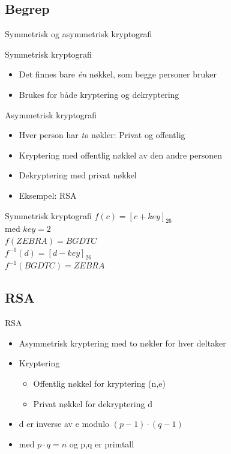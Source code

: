 \subsection*{Begrep}
\begin{frame}{Symmetrisk og asymmetrisk kryptografi}
\begin{block}{Symmetrisk kryptografi}
\begin{itemize}
\item Det finnes bare \textit{én} nøkkel, som begge personer bruker
\item Brukes for både kryptering og dekryptering
\end{itemize}
\end{block}
\pause
\begin{block}{Asymmetrisk kryptografi}
\begin{itemize}
\item Hver person har \textit{to} nøkler: Privat og offentlig
\item Kryptering med offentlig nøkkel av den andre personen
\item Dekryptering med privat nøkkel
\item Eksempel: RSA
\end{itemize}
\end{block}
\end{frame}

\begin{frame}{Symmetrisk kryptografi}
    $f(c)=[c+key]_{26}$\\
    med $key=2$\\
    $f(ZEBRA)=BGDTC$\\
    
    $f^{-1}(d)=[d-key]_{26}$\\
    $f^{-1}(BGDTC)=ZEBRA$
\end{frame}

\subsection*{RSA}
\begin{frame}{RSA}
\begin{itemize}[<+->]
\item Asymmetrisk kryptering med to nøkler for hver deltaker
\item Kryptering
	\begin{itemize}
	\item Offentlig nøkkel for kryptering (n,e)
	\item Privat nøkkel for dekryptering d
	\end{itemize}
 \item d er inverse av e modulo $(p-1)\cdot (q-1)$ 
 \item med $p\cdot q=n$ og p,q er primtall
\end{itemize}
\end{frame}

